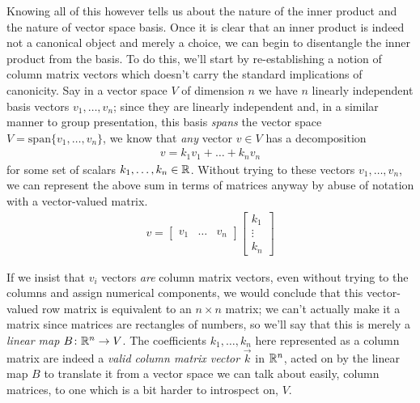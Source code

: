 \documentclass[11pt]{article}
\begin{document}
Knowing all of this however tells us about the nature of the inner product and the nature of vector space basis. Once it is clear that an inner product is indeed not a canonical object and merely a choice, we can begin to disentangle the inner product from the basis. To do this, we'll start by re-establishing a notion of column matrix vectors which doesn't carry the standard implications of canonicity. Say in a vector space $V$ of dimension $n$ we have $n$ linearly independent basis vectors $v_1, \dots, v_n$; since they are linearly independent and, in a similar manner to group presentation, this basis \emph{spans} the vector space $V = \mathrm{span}\{v_1,\dots,v_n\}$, we know that \emph{any} vector $v \in V$ has a decomposition \begin{gather*}
v = k_1 v_1 + \dots + k_n v_n
\end{gather*}
for some set of scalars $k_1, \dots, k_n \in \mathbb{R}$. Without trying to  these vectors $v_1, \dots, v_n$, we can represent the above sum in terms of matrices anyway by abuse of notation with a vector-valued matrix. \begin{gather*}
v = \begin{bmatrix} v_1 & \dots & v_n \end{bmatrix} \begin{bmatrix} k_1 \\ \vdots \\ k_n \end{bmatrix}
\end{gather*}

If we insist that $v_i$ vectors \emph{are} column matrix vectors, even without trying to  the columns and assign numerical components, we would conclude that this vector-valued row matrix is equivalent to an $n \times n$ matrix; we can't actually make it a matrix since matrices are rectangles of numbers, so we'll say that this  is merely a \emph{linear map} $B \colon \mathbb{R}^n \to V$. The coefficients $k_1, \dots, k_n$ here represented as a column matrix are indeed a \emph{valid column matrix vector} $\vec k $ in $\mathbb{R}^n$, acted on by the linear map $B$ to translate it from a vector space we can talk about easily, column matrices, to one which is a bit harder to introspect on, $V$.
\end{document}
